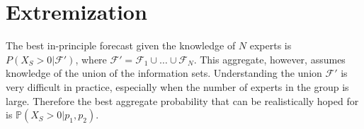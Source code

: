 \documentclass[11pt,twoside]{article}
\renewcommand{\P}{\mathbb{P}}
\begin{document}
%


\section{Extremization}
\label{extremization}

The best in-principle forecast given the knowledge of $N$ experts is $P(X_{S} > 0 |  \mathcal{F}')$, where $\mathcal{F}' = \mathcal{F}_1 \cup \dots \cup \mathcal{F}_N$. This aggregate, however, assumes knowledge of the union of the information sets. Understanding the union $\mathcal{F}'$ is very difficult in practice, especially when the number of experts in the group is large. Therefore the best aggregate probability that can be realistically hoped for is  $\P(X_{S} > 0 | p_1, p_2)$.
\end{document}
